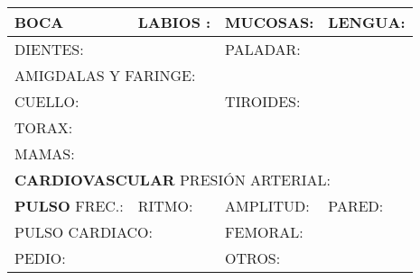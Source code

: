 \documentclass[10pt,a4paper]{article}
\begin{document}
{\begin{tabular}{|p{2.8cm}p{2.8cm}p{2.8cm}p{2.8cm}|}
\hline
\scriptsize{\textbf{BOCA}}&\scriptsize{  LABIOS : } &\scriptsize{MUCOSAS: } & \scriptsize{LENGUA: } \\
\hline
\multicolumn{2}{|l}{\begin{minipage}[t]{5.5 cm}\scriptsize{DIENTES: }\end{minipage}}&\multicolumn{2}{l|}{\begin{minipage}[t]{5.5 cm}\scriptsize{PALADAR: }\end{minipage}}\\
\hline
\multicolumn{4}{|l|}{\begin{minipage}[t]{12.5 cm}\scriptsize{AMIGDALAS Y FARINGE: }\end{minipage}}\\
\hline
\multicolumn{2}{|l}{\begin{minipage}[t]{5.5 cm}\scriptsize{CUELLO: }\end{minipage}}&\multicolumn{2}{l|}{\begin{minipage}[t]{5.5 cm}\scriptsize{TIROIDES: }\end{minipage}}\\
\hline
\multicolumn{4}{|l|}{\begin{minipage}[t]{12.5 cm}\scriptsize{TORAX: }\end{minipage}}\\
\hline
\multicolumn{4}{|l|}{\begin{minipage}[t]{12.5 cm}\scriptsize{MAMAS: }\end{minipage}}\\
\hline
\multicolumn{4}{|l|}{\begin{minipage}[t]{12.5 cm}\scriptsize{\textbf{CARDIOVASCULAR}  PRESI\'ON ARTERIAL: }\end{minipage}}\\
\hline
\scriptsize{\textbf{PULSO}  FREC.: } & \scriptsize{RITMO: } & \scriptsize{AMPLITUD: } & \scriptsize{PARED: } \\
\hline
\multicolumn{2}{|l}{\begin{minipage}[t]{5.5 cm}\scriptsize{PULSO CARDIACO: }\end{minipage}}&\multicolumn{2}{l|}{\begin{minipage}[t]{5.5 cm}\scriptsize{FEMORAL: }\end{minipage}}\\
\hline
\multicolumn{2}{|l}{\begin{minipage}[t]{5.5 cm}\scriptsize{PEDIO: }\end{minipage}}&\multicolumn{2}{l|}{\begin{minipage}[t]{5.5 cm}\scriptsize{OTROS: }\end{minipage}}\\

\end{tabular}}
\end{document}
